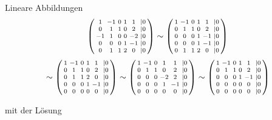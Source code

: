 \begin{example2}[breakable]{Lineare Abbildungen}
$$
\begin{psmallmatrix}
    1 & -1 & 0 & 1 & 1 & |0 \\
    0 & 1 & 1 & 0 & 2 & |0 \\
    -1 & 1 & 0 & 0 & -2 & |0 \\
    0 & 0 & 0 & 1 & -1 & |0 \\
    0 & 1 & 1 & 2 & 0 & |0
\end{psmallmatrix} \sim 
\begin{psmallmatrix}
    1 & -1 & 0 & 1 & 1 & |0 \\
    0 & 1 & 1 & 0 & 2 & |0 \\
    0 & 0 & 0 & 1 & -1 & |0 \\
    0 & 0 & 0 & 1 & -1 & |0 \\
    0 & 1 & 1 & 2 & 0 & |0
\end{psmallmatrix} 
$$
$$
\sim
\begin{psmallmatrix}
    1 & -1 & 0 & 1 & 1 & |0 \\
    0 & 1 & 1 & 0 & 2 & |0 \\
    0 & 1 & 1 & 2 & 0 & |0 \\
    0 & 0 & 0 & 1 & -1 & |0 \\
    0 & 0 & 0 & 0 & 0 & |0
\end{psmallmatrix} \sim
\begin{psmallmatrix}
    1 & -1 & 0 & 1 & 1 & |0 \\
    0 & 1 & 1 & 0 & 2 & |0 \\
    0 & 0 & 0 & -2 & 2 & |0 \\
    0 & 0 & 0 & 1 & -1 & |0 \\
    0 & 0 & 0 & 0 & 0 & |0
\end{psmallmatrix} \sim
\begin{psmallmatrix}
    1 & -1 & 0 & 1 & 1 & |0 \\
    0 & 1 & 1 & 0 & 2 & |0 \\
    0 & 0 & 0 & 1 & -1 & |0 \\
    0 & 0 & 0 & 0 & 0 & |0 \\
    0 & 0 & 0 & 0 & 0 & |0
\end{psmallmatrix}
$$

mit der Lösung


\end{example2}
